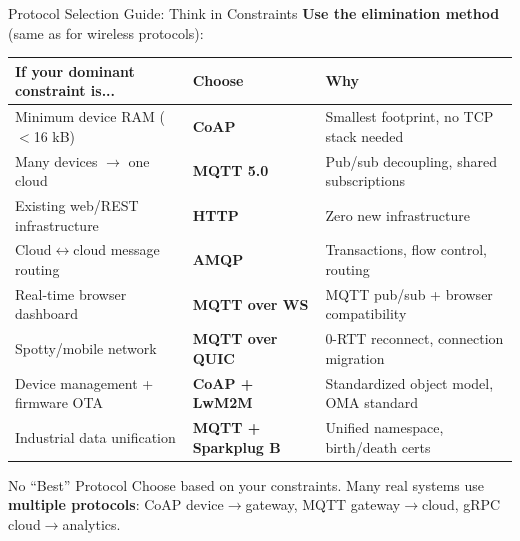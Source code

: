 \documentclass[aspectratio=169,11pt]{beamer}
\begin{document}
\begin{frame}{Protocol Selection Guide: Think in Constraints}
    \textbf{Use the elimination method} (same as for wireless protocols):
    
    \vspace{0.3cm}
    \begin{center}
    \footnotesize
    \begin{tabular}{p{4.5cm}p{3cm}p{4.5cm}}
        \toprule
        \textbf{If your dominant constraint is...} & \textbf{Choose} & \textbf{Why} \\
        \midrule
        Minimum device RAM ($<$16 kB) & \textbf{CoAP} & Smallest footprint, no TCP stack needed \\
        \addlinespace
        Many devices $\rightarrow$ one cloud & \textbf{MQTT 5.0} & Pub/sub decoupling, shared subscriptions \\
        \addlinespace
        Existing web/REST infrastructure & \textbf{HTTP} & Zero new infrastructure \\
        \addlinespace
        Cloud$\leftrightarrow$cloud message routing & \textbf{AMQP} & Transactions, flow control, routing \\
        \addlinespace
        Real-time browser dashboard & \textbf{MQTT over WS} & MQTT pub/sub + browser compatibility \\
        \addlinespace
        Spotty/mobile network & \textbf{MQTT over QUIC} & 0-RTT reconnect, connection migration \\
        \addlinespace
        Device management + firmware OTA & \textbf{CoAP + LwM2M} & Standardized object model, OMA standard \\
        \addlinespace
        Industrial data unification & \textbf{MQTT + Sparkplug B} & Unified namespace, birth/death certs \\
        \bottomrule
    \end{tabular}
    \normalsize
    \end{center}
    
    \vspace{0.1cm}
    \begin{alertblock}{No ``Best'' Protocol}
        Choose based on your constraints. Many real systems use \textbf{multiple protocols}: CoAP device$\rightarrow$gateway, MQTT gateway$\rightarrow$cloud, gRPC cloud$\rightarrow$analytics.
    \end{alertblock}
\end{frame}
\end{document}
